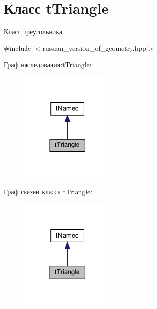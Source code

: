 \hypertarget{classtTriangle}{}\section{Класс t\+Triangle}
\label{classtTriangle}


Класс треугольника  




{\ttfamily \#include $<$russian\+\_\+version\+\_\+of\+\_\+geometry.\+hpp$>$}



Граф наследования\+:t\+Triangle\+:\nopagebreak
\begin{figure}[H]
\begin{center}
\leavevmode
\includegraphics[width=134pt]{classtTriangle__inherit__graph}
\end{center}
\end{figure}


Граф связей класса t\+Triangle\+:\nopagebreak
\begin{figure}[H]
\begin{center}
\leavevmode
\includegraphics[width=134pt]{classtTriangle__coll__graph}
\end{center}
\end{figure}
